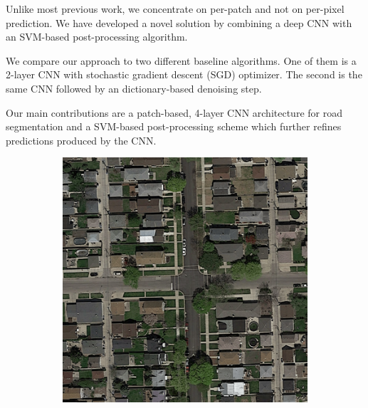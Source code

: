 \documentclass[10pt,conference,compsocconf]{IEEEtran}
\begin{document}
Unlike most previous work, we concentrate on per-patch and not on per-pixel prediction. We have developed a novel solution by combining a deep CNN with an SVM-based post-processing algorithm.

We compare our approach to two different baseline algorithms. One of them is a 2-layer CNN with stochastic gradient descent (SGD) optimizer. The second is the same CNN followed by an dictionary-based denoising \cite{Elad.2006} step.

Our main contributions are a patch-based, \mbox{4-layer} CNN architecture for road segmentation and a SVM-based post-processing scheme which further refines predictions produced by the CNN.

\begin{figure}
	\centering
	\begin{subfigure}{.2\textwidth}
		\includegraphics[width=1\textwidth]{figs/img1.png}
	\end{subfigure}
	\begin{subfigure}{.2\textwidth}

\end{subfigure}
\end{figure}
\end{document}
